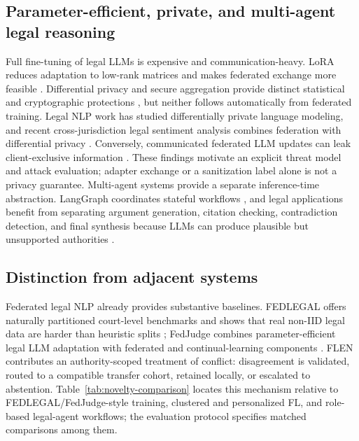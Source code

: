 \documentclass[a4paper,fleqn]{cas-sc}
\begin{document}
\subsection{Parameter-efficient, private, and multi-agent legal reasoning}

Full fine-tuning of legal LLMs is expensive and communication-heavy. LoRA reduces adaptation to low-rank matrices and makes federated exchange more feasible \citep{hu2022lora}. Differential privacy and secure aggregation provide distinct statistical and cryptographic protections \citep{abadi2016deep,bonawitz2017practical}, but neither follows automatically from federated training. Legal NLP work has studied differentially private language modeling, and recent cross-jurisdiction legal sentiment analysis combines federation with differential privacy \citep{yin2022privacy,xu2025crossjurisdiction}. Conversely, communicated federated LLM updates can leak client-exclusive information \citep{Hu2025SimpleYE}. These findings motivate an explicit threat model and attack evaluation; adapter exchange or a sanitization label alone is not a privacy guarantee. Multi-agent systems provide a separate inference-time abstraction. LangGraph coordinates stateful workflows \citep{langgraph2024}, and legal applications benefit from separating argument generation, citation checking, contradiction detection, and final synthesis because LLMs can produce plausible but unsupported authorities \citep{dahl2024large}.

\subsection{Distinction from adjacent systems}

Federated legal NLP already provides substantive baselines. FEDLEGAL offers naturally partitioned court-level benchmarks and shows that real non-IID legal data are harder than heuristic splits \citep{Zhang2023FEDLEGALTF}; FedJudge combines parameter-efficient legal LLM adaptation with federated and continual-learning components \citep{Yue2023FedJudgeFL}. FLEN contributes an authority-scoped treatment of conflict: disagreement is validated, routed to a compatible transfer cohort, retained locally, or escalated to abstention. Table~\ref{tab:novelty-comparison} locates this mechanism relative to FEDLEGAL/FedJudge-style training, clustered and personalized FL, and role-based legal-agent workflows; the evaluation protocol specifies matched comparisons among them.


\end{document}
